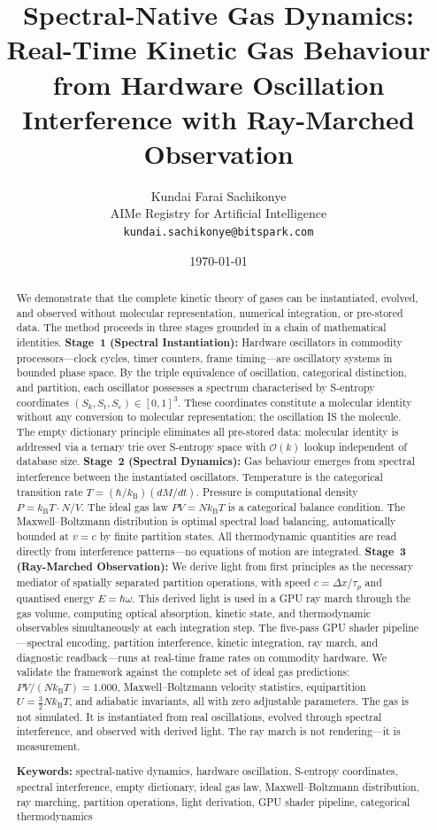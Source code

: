 \documentclass[twocolumn,10pt,a4paper]{article}
\title{\textbf{Spectral-Native Gas Dynamics:\\Real-Time Kinetic Gas Behaviour from Hardware Oscillation\\Interference with Ray-Marched Observation}}
\author{
Kundai Farai Sachikonye\\
AIMe Registry for Artificial Intelligence\\
\texttt{kundai.sachikonye@bitspark.com}
}
\date{\today}
\theoremstyle{plain}
\theoremstyle{definition}
\theoremstyle{remark}
\newcommand{\kB}{k_{\mathrm{B}}}
\newcommand{\Sk}{S_k}
\newcommand{\St}{S_t}
\newcommand{\Se}{S_e}
\newcommand{\taup}{\tau_p}
\newcommand{\BigO}{\mathcal{O}}
\begin{document}
\maketitle

\begin{abstract}
\noindent We demonstrate that the complete kinetic theory of gases can be instantiated, evolved, and observed without molecular representation, numerical integration, or pre-stored data. The method proceeds in three stages grounded in a chain of mathematical identities. \textbf{Stage~1 (Spectral Instantiation):} Hardware oscillators in commodity processors---clock cycles, timer counters, frame timing---are oscillatory systems in bounded phase space. By the triple equivalence of oscillation, categorical distinction, and partition, each oscillator possesses a spectrum characterised by S-entropy coordinates $(\Sk, \St, \Se) \in [0,1]^3$. These coordinates constitute a molecular identity without any conversion to molecular representation; the oscillation IS the molecule. The empty dictionary principle eliminates all pre-stored data: molecular identity is addressed via a ternary trie over S-entropy space with $\BigO(k)$ lookup independent of database size. \textbf{Stage~2 (Spectral Dynamics):} Gas behaviour emerges from spectral interference between the instantiated oscillators. Temperature is the categorical transition rate $T = (\hbar/\kB)(dM/dt)$. Pressure is computational density $P = \kB T \cdot N/V$. The ideal gas law $PV = N\kB T$ is a categorical balance condition. The Maxwell--Boltzmann distribution is optimal spectral load balancing, automatically bounded at $v = c$ by finite partition states. All thermodynamic quantities are read directly from interference patterns---no equations of motion are integrated. \textbf{Stage~3 (Ray-Marched Observation):} We derive light from first principles as the necessary mediator of spatially separated partition operations, with speed $c = \Delta x/\taup$ and quantised energy $E = \hbar\omega$. This derived light is used in a GPU ray march through the gas volume, computing optical absorption, kinetic state, and thermodynamic observables simultaneously at each integration step. The five-pass GPU shader pipeline---spectral encoding, partition interference, kinetic integration, ray march, and diagnostic readback---runs at real-time frame rates on commodity hardware. We validate the framework against the complete set of ideal gas predictions: $PV/(N\kB T) = 1.000$, Maxwell--Boltzmann velocity statistics, equipartition $U = \tfrac{3}{2}N\kB T$, and adiabatic invariants, all with zero adjustable parameters. The gas is not simulated. It is instantiated from real oscillations, evolved through spectral interference, and observed with derived light. The ray march is not rendering---it is measurement.

\medskip
\noindent\textbf{Keywords:} spectral-native dynamics, hardware oscillation, S-entropy coordinates, spectral interference, empty dictionary, ideal gas law, Maxwell--Boltzmann distribution, ray marching, partition operations, light derivation, GPU shader pipeline, categorical thermodynamics
\end{abstract}
\end{document}
